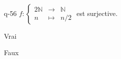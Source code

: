 \begin{truefalse}{q-56}
$f:\left\{\begin{array}{ccc}2\mathbb{N} & \to & \mathbb{N} \\n & \mapsto & n/2\end{array}\right.$ est surjective.
\item* Vrai
\item Faux
\end{truefalse}

